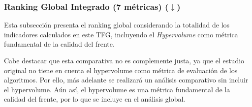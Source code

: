 \documentclass[a4paper,10pt]{article}
\begin{document}
\subsubsection{Ranking Global Integrado (7 métricas) \texorpdfstring{($\downarrow$)}{(down)}}

Esta subsección presenta el ranking global considerando la totalidad de los indicadores calculados en este TFG, incluyendo el \textit{Hypervolume} como métrica fundamental de la calidad del frente.

Cabe destacar que esta comparativa no es complemente justa, ya que el estudio original no tiene en cuenta el hypervolume como métrica de evaluación de los algoritmos. Por ello, más adelante se realizará un análisis comparativo sin incluir el hypervolume. Aún así, el hypervolume es una métrica fundamental de la calidad del frente, por lo que se incluye en el análisis global.
\end{document}
